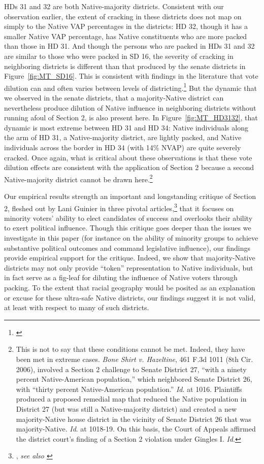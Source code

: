 \documentclass[12pt]{article}
\begin{document}
HDs 31 and 32 are both Native-majority districts.  Consistent with our observation earlier, the extent of cracking in these districts does not map on simply to the Native VAP percentages in the districts: HD 32, though it has a smaller Native VAP percentage, has Native constituents who are more packed than those in HD 31. And though the persons who are packed in HDs 31 and 32 are similar to those who were packed in SD 16, the severity of cracking in neighboring districts is different than that produced by the senate districts in Figure~\ref{fig:MT_SD16}.  This is consistent with findings in the literature that vote dilution can and often varies between levels of districting.\footnote{\cite{eubank_rodden_2020}}  But the dynamic that we observed in the senate districts, that a majority-Native district can nevertheless produce dilution of Native influence in neighboring districts without running afoul of Section 2, is also present here. In Figure~\ref{fig:MT_HD3132}, that dynamic is most extreme between HD 31 and HD 34: Native individuals along the arm of HD 31, a Native-majority district, are lightly packed, and Native individuals across the border in HD 34 (with 14\% NVAP) are quite severely cracked.  Once again, what is critical about these observations is that these vote dilution effects are consistent with the application of Section 2 because a second Native-majority district cannot be drawn here.\footnote{This is not to say that these conditions cannot be met.  Indeed, they have been met in extreme cases. \textit{Bone Shirt v. Hazeltine}, 461 F.3d 1011 (8th Cir. 2006), involved a Section 2 challenge to Senate District 27, “with a ninety percent Native-American population,” which neighbored Senate District 26, with “thirty percent Native-American population.” \textit{Id}. at 1016.  Plaintiffs produced a proposed remedial map that reduced the Native population in District 27 (but was still a Native-majority district) and created a new majority-Native house district in the vicinity of Senate District 26 that was majority-Native. \textit{Id}. at 1018-19. On this basis, the Court of Appeals affirmed the district court's finding of a Section 2 violation under Gingles I. \textit{Id}.}

Our empirical results strength an important and longstanding critique of Section 2, fleshed out by Lani Guinier in three pivotal articles,\footnote{\cite{guinier1989keeping,guinier1991seats,guinier1991triumph}, \textit{see also \cite{karlan1995tyranny}}} that it focuses on minority voters' ability to elect candidates of success and overlooks their ability to exert political influence. Though this critique goes deeper than the issues we investigate in this paper (for instance on the ability of minority groups to achieve substantive political outcomes and command legislative influence), our findings provide empirical support for the critique.  Indeed, we show that majority-Native districts may not only provide ``token'' representation to Native individuals, but in fact serve as a fig-leaf for diluting the influence of Native voters through packing.  To the extent that racial geography would be posited as an explanation or excuse for these ultra-safe Native districts, our findings suggest it is not valid, at least with respect to many of such districts.
\end{document}
